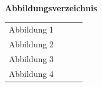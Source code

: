 \documentclass[a4paper]{article}
\begin{document}
\bigskip


\bigskip


\bigskip


\bigskip


\bigskip


\bigskip


\bigskip


\bigskip


\bigskip


\bigskip


\bigskip


\bigskip


\bigskip


\bigskip


\bigskip


\bigskip


\bigskip


\bigskip


\bigskip


\bigskip


\bigskip


\bigskip


\bigskip


\bigskip


\bigskip


\bigskip


\bigskip


\bigskip


\bigskip


\bigskip


\bigskip


\bigskip


\bigskip


\bigskip


\bigskip


\bigskip


\bigskip


\bigskip


\bigskip


\bigskip


\bigskip

{\sffamily\bfseries
Abbildungsverzeichnis}


\bigskip

\begin{flushleft}
\tablefirsthead{}
\tablehead{}
\tabletail{}
\tablelasttail{}
\begin{supertabular}{m{2.213cm}m{1.7049999cm}m{10.729cm}}
{\sffamily Abbildung 1} &
~
 &
~
\\
{\sffamily Abbildung 2} &
~
 &
~
\\
{\sffamily Abbildung 3} &
~
 &
~
\\
{\sffamily Abbildung 4} &
~
 &
~
\\
\end{supertabular}
\end{flushleft}

\bigskip


\bigskip


\bigskip


\bigskip
\end{document}
